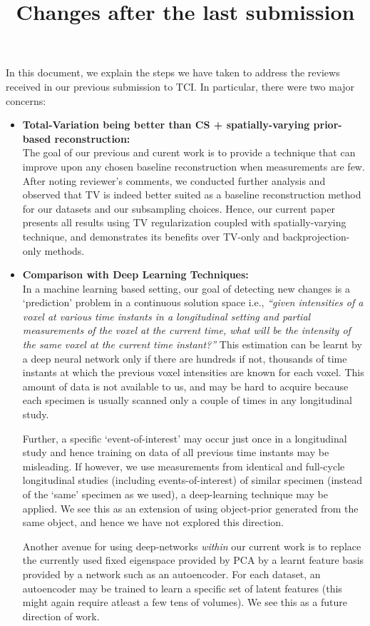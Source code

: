 \documentclass{article}
\title{Changes after the last submission}
\begin{document}
\maketitle
In this document, we explain the steps we have taken to address the reviews received in our previous submission to TCI. In particular, there were two major concerns:

\begin{itemize}
\item \textbf{Total-Variation being better than CS + spatially-varying prior-based reconstruction:}\\

  The goal of our previous and curent work is to provide a technique that can improve upon any chosen baseline reconstruction when measurements are few. After noting reviewer's comments, we conducted further analysis and observed that TV is indeed better suited as a baseline reconstruction method for our datasets and our subsampling choices. Hence, our current paper presents all results using TV regularization coupled with spatially-varying technique, and demonstrates its benefits over TV-only and backprojection-only methods.

\item \textbf{Comparison with Deep Learning Techniques:}\\
  
  In a machine learning based setting, our goal of detecting new changes is a `prediction' problem in a continuous solution space i.e., \textit{``given intensities of a voxel at various time instants in a longitudinal setting and partial measurements of the voxel at the current time, what will be the intensity of the same voxel at the current time instant?''} This estimation can be learnt by a deep neural network only if there are hundreds if not, thousands of time instants at which the previous voxel intensities are known for each voxel. This amount of data is not available to us, and may be hard to acquire because each specimen is usually scanned only a couple of times in any longitudinal study.

  Further, a specific `event-of-interest' may occur just once in a longitudinal study and hence training on data of all previous time instants may be misleading. If however, we use measurements from identical and full-cycle longitudinal studies (including events-of-interest) of similar specimen (instead of the `same' specimen as we used), a deep-learning technique may be applied. We see this as an extension of using object-prior generated from the same object, and hence we have not explored this direction.

  Another avenue for using deep-networks \textit{within} our current work is to replace the currently used fixed eigenspace provided by PCA by a learnt feature basis provided by a network such as an autoencoder. For each dataset, an autoencoder may be trained to learn a specific set of latent features (this might again require atleast a few tens of volumes). We see this as a future direction of work. 

  
  
\end{itemize}
\end{document}

